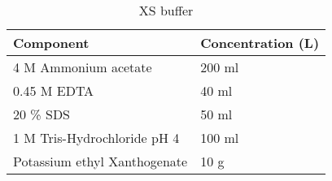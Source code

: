 \documentclass[twoside]{article}
\begin{document}
\begin{table}
\caption{XS buffer}
\begin{tabular}{  p{6.9cm} | p{6.9cm}  }
\hline
Component & Concentration (L) \\
\hline
 4 M Ammonium acetate & 200 ml  \\
  0.45 M EDTA  & 40 ml \\
    20 \% SDS  & 50 ml \\
    1 M Tris-Hydrochloride pH 4    & 100 ml  \\
        Potassium ethyl Xanthogenate  & 10 g  \\
  \hline
\end{tabular}
\end{table}
\end{document}

